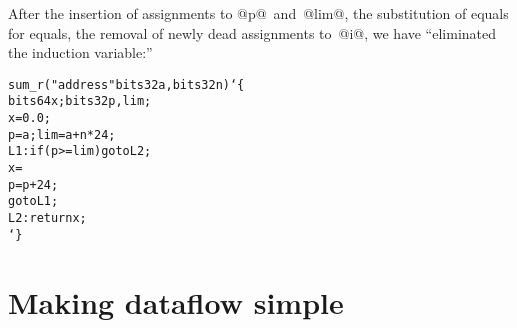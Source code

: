 \documentclass[blockstyle,preprint,nocopyrightspace]{sigplanconf}
\newcommand\lbr{\char`\{}
\newcommand\rbr{\char`\}}
\newcommand\seclabel[1]{\label{sec:#1}}
\begin{document}
After the insertion of assignments to @p@~and~@lim@, the substitution
of equals for equals, the removal of newly dead assignments
to~@i@, we have ``eliminated the induction variable:''
\begin{alltt}
sum_r("address" bits32 a, bits32 n) \lbr
     bits64 x; bits32 p, lim;
     x = 0.0;
     p = a; lim = a + n * 24;
 L1: if ({p >= lim}) goto L2;
     x = %fadd(x, bits64[{p}]);
     p = p + 24;
     goto L1;
 L2: return x; 
\rbr
\end{alltt}

  
\section {Making dataflow simple}

\seclabel{making-simple}

\seclabel{create-analysis}
\end{document}
